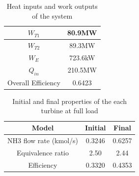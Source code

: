   \begin{table} [h]
\begin{center}
\caption{Heat inputs and work outputs of the system} \label{tab:powerdata}
\begin{tabular}{ |c|c| }
 \hline
  $W_{T1}$ & 80.9MW\\ 
 \hline
  $W_{T2}$ & 89.3MW\\
  \hline
  $W_E$ & 723.6kW\\
 \hline
 $Q_{in}$ & 210.5MW\\
 \hline
 Overall Efficiency & 0.6423\\ 
 \hline
\end{tabular}
\end{center}  
\end{table}

  \begin{table} [h]
\begin{center}
\caption{Initial and final properties of the each turbine at full load} \label{tab:powerdata}
\begin{tabular}{ |c|c|c| }
 \hline
  Model & Initial & Final\\ 
 \hline
   NH3 flow rate (kmol/s) & 0.3246 & 0.6257\\
  \hline
  Equivalence ratio & 2.50 & 2.44\\
 \hline
  Efficiency & 0.3320 & 0.4353\\
 \hline
\end{tabular}
\end{center}  
\end{table}





%
